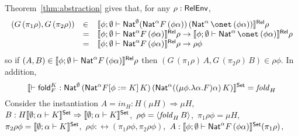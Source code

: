 \documentclass{lmcs}
\theoremstyle{plain}\newtheorem{satz}[thm]{Satz}
\newcommand{\fold}{\mathsf{fold}}
\newcommand{\F}{\mathcal{F}}
\begin{document}
\proof
%  
Theorem~\ref{thm:abstraction} gives that, for any 
$\rho : \mathsf{RelEnv}$,
\[\begin{array}{lll}
(G \,(\pi_1 \rho), G\, (\pi_2 \rho))
& \in & \relsem{\phi;\emptyset\vdash \Nat^{\emptyset} (\Nat^\alpha
  F\, (\phi\alpha))\, (\Nat^\alpha\,\onet \, (\phi\alpha))}
\rho\\ 
& = & \relsem{\phi;\emptyset\vdash \Nat^\alpha F\,
  (\phi\alpha)}\rho \to \relsem{\phi;\emptyset\vdash
  \Nat^\alpha\,\onet \, (\phi\alpha)}\rho\\ 
& = & \relsem{\phi;\emptyset\vdash \Nat^\alpha F\,
  (\phi\alpha)}\rho \to \rho \phi
\end{array}\]
\noindent
so if $(A, B) \in \llbracket{\phi;\emptyset\vdash \mathsf{Nat}^\alpha F\,
  (\phi\alpha)}\rrbracket^{\mathsf{Rel}}\rho$ then $(G \,(\pi_1 \rho)\, A, G\, (\pi_2 \rho)\,
B) \in \rho \phi$.
In addition,
\[\setsem{\vdash \fold_F^K :
  \Nat^{\emptyset}\, (\Nat^\alpha F[\phi := K]\,K)\, (\Nat^\alpha
  ((\mu \phi.\lambda\alpha.F)\alpha)\,K)} = \mathit{fold}_H\]
Consider the instantiation $A = \mathit{in}_H : H (\mu H) \Rightarrow
\mu H$,\, $B : H\llbracket{\emptyset;\alpha\vdash K}\rrbracket^{\mathsf{Set}} \Rightarrow
\llbracket{\emptyset;\alpha \vdash K}\rrbracket^{\mathsf{Set}}$,\, $\rho \phi =
\langle {\mathit{fold}_H\, B} \rangle$,\, $\pi_1 \rho \phi = \mu H$,\, $\pi_2
\rho \phi = \llbracket{\emptyset;\alpha\vdash K}\rrbracket^{\mathsf{Set}}$,\, $\rho \phi :
\rel(\pi_1 \rho \phi, \pi_2 \rho \phi)$,\, $A : \llbracket{\phi;
  \emptyset \vdash \mathsf{Nat}^\alpha F \, (\phi \alpha)}\rrbracket^{\mathsf{Set}} (\pi_1 \rho)$,\,
\end{document}
